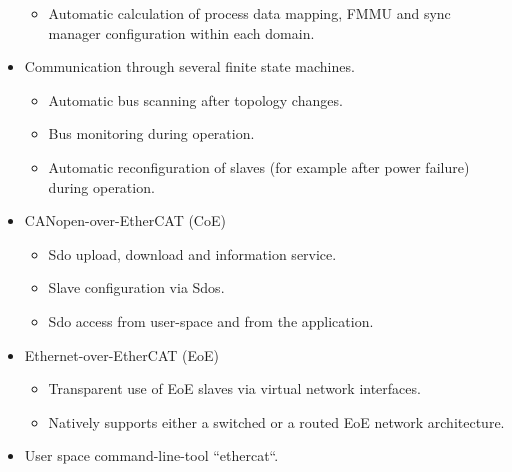 \documentclass[a4paper,12pt,BCOR6mm,bibtotoc,idxtotoc]{scrbook}
\begin{document}
\begin{itemize}
\begin{itemize}
  \item Automatic calculation of process data mapping, FMMU and sync manager
  configuration within each domain.

  \end{itemize}

\item Communication through several finite state machines.

  \begin{itemize}

  \item Automatic bus scanning after topology changes.

  \item Bus monitoring during operation.

  \item Automatic reconfiguration of slaves (for example after power failure)
  during operation.

  \end{itemize}

\item CANopen-over-EtherCAT (CoE)

  \begin{itemize}

  \item Sdo upload, download and information service.

  \item Slave configuration via Sdos.

  \item Sdo access from user-space and from the application.

  \end{itemize}

\item Ethernet-over-EtherCAT (EoE)

  \begin{itemize}

  \item Transparent use of EoE slaves via virtual network interfaces.

  \item Natively supports either a switched or a routed EoE network
  architecture.

  \end{itemize}

\item User space command-line-tool ``ethercat``.

  \begin{itemize}


\end{itemize}
\end{itemize}
\end{document}
